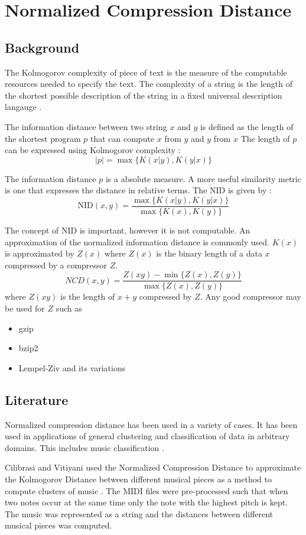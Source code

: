 \section{Normalized Compression Distance} \label{sec:class_ncd}
\subsection{Background}
The Kolmogorov complexity of piece of text is the measure of the computable resources needed to specify the text. The complexity of a string is the length of the shortest possible description of the string in a fixed universal description langauge \cite{Kolmogorov1998387}.

The information distance between two string $x$ and $y$ is defined as the length of the shortest program $p$ that can compute $x$ from $y$ and $y$ from $x$
The length of $p$ can be expressed using Kolmogorov complexity \cite{681318}:
\[ |p| = \max\{K(x|y), K(y|x)\}  \]

The information distance $p$ is a absolute measure. A more useful similarity metric is one that expresses the distance in relative terms. 
The \ac{NID} is given by \cite{1362909} : 
\[ \text{NID}(x,y) = \frac{\max\{K(x|y),K(y|x)\}}{\max\{K(x),K(y)\}} \]

The concept of \ac{NID} is important, however it is not computable. 
An approximation of the normalized information distance is commonly used.  $K(x)$ is approximated by $Z(x)$ where $Z(x)$ is the binary length of a data $x$ compressed by a compressor $Z$.
\[NCD(x,y) = \frac{Z(xy) - \min\{ Z(x), Z(y) \}}{\max\{ Z(x), Z(y) \}} \]
where $Z(xy)$ is the length of $x+y$ compressed by $Z$. 
Any good compressor may be used for $Z$ such as 
\begin{itemize}
\item gzip
\item bzip2
\item Lempel-Ziv and its variations
\end{itemize}
\subsection{Literature}
Normalized compression distance has been used in a variety of cases. It has been used in applications of general clustering and classification of data in arbitrary domains. This includes music classification \cite{1412045}.

Cilibrasi and Vitiyani used the Normalized Compression Distance to approximate the Kolmogorov Distance between different musical pieces as a method to compute clusters of music \cite{1412045}. The \ac{MIDI} files were pre-processed such that when two notes occur at the same time only the note with the highest pitch is kept. The music was represented as a string and the distances between different musical pieces was computed.


